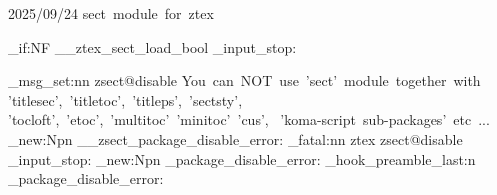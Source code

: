  {2025/09/24}{\ztex@versi@n}
  {sect~module~for~ztex}




\bool_if:NF \g__ztex_sect_load_bool 
  { \file_input_stop: }


\ztex_msg_set:nn { zsect@disable }
  {
    You~can~NOT~use~'sect'~module~together~with~
    'titlesec',~'titletoc',~'titleps',~'sectsty',~
    'tocloft',~'etoc',~'multitoc'~'minitoc'~'cus',~
    'koma-script~sub-packages'~etc~...
  }
\cs_new:Npn \__zsect_package_disable_error:
  {
    \msg_fatal:nn { ztex } { zsect@disable }
    \file_input_stop:
  }
\cs_new:Npn \zsect_package_disable_error:
  {
  }
\ztex_hook_preamble_last:n 
  {
    \zsect_package_disable_error:
  }



